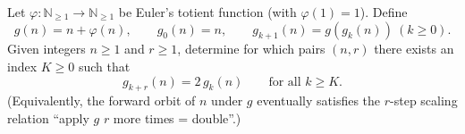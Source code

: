 Let $\varphi:\mathbb{N}_{\ge 1}\to\mathbb{N}_{\ge 1}$ be Euler's totient function (with $\varphi(1)=1$). Define
\[
  g(n)=n+\varphi(n),\qquad g_0(n)=n,\qquad g_{k+1}(n)=g(g_k(n))\ (k\ge 0).
\]
Given integers $n\ge 1$ and $r\ge 1$, determine for which pairs $(n,r)$ there exists an index $K\ge 0$ such that
\[
  g_{k+r}(n)=2\,g_k(n)\qquad\text{for all }k\ge K.
\]
(Equivalently, the forward orbit of $n$ under $g$ eventually satisfies the $r$-step scaling relation ``apply $g$ $r$ more times = double''.)
